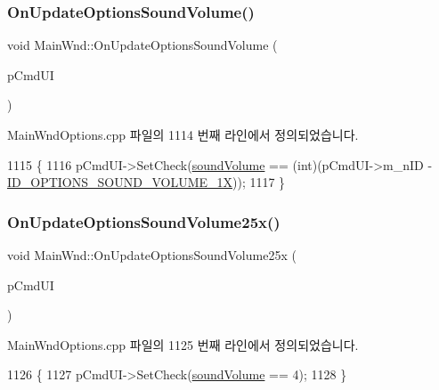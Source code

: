\subsubsection{\texorpdfstring{On\+Update\+Options\+Sound\+Volume()}{OnUpdateOptionsSoundVolume()}}
{\footnotesize\ttfamily void Main\+Wnd\+::\+On\+Update\+Options\+Sound\+Volume (\begin{DoxyParamCaption}\item[{C\+Cmd\+UI $\ast$}]{p\+Cmd\+UI }\end{DoxyParamCaption})}



Main\+Wnd\+Options.\+cpp 파일의 1114 번째 라인에서 정의되었습니다.


\begin{DoxyCode}
1115 \{
1116   pCmdUI->SetCheck(\mbox{\hyperlink{gb_sound_8cpp_a44346dfa73de6666c4727594bb20f6b7}{soundVolume}} == (\textcolor{keywordtype}{int})(pCmdUI->m\_nID - 
      \mbox{\hyperlink{resource_8h_ad321e1e7a049df3b4273c9872c5354fe}{ID\_OPTIONS\_SOUND\_VOLUME\_1X}}));
1117 \}
\end{DoxyCode}
\mbox{\label{class_main_wnd_a87b6c7456e128d8d0740c7265a080285}} 
\subsubsection{\texorpdfstring{On\+Update\+Options\+Sound\+Volume25x()}{OnUpdateOptionsSoundVolume25x()}}
{\footnotesize\ttfamily void Main\+Wnd\+::\+On\+Update\+Options\+Sound\+Volume25x (\begin{DoxyParamCaption}\item[{C\+Cmd\+UI $\ast$}]{p\+Cmd\+UI }\end{DoxyParamCaption})\hspace{0.3cm}{\ttfamily [protected]}}



Main\+Wnd\+Options.\+cpp 파일의 1125 번째 라인에서 정의되었습니다.


\begin{DoxyCode}
1126 \{
1127   pCmdUI->SetCheck(\mbox{\hyperlink{gb_sound_8cpp_a44346dfa73de6666c4727594bb20f6b7}{soundVolume}} == 4);
1128 \}
\end{DoxyCode}
\mbox{\label{class_main_wnd_ae343c11545af1642af98dfa03584e114}} 
